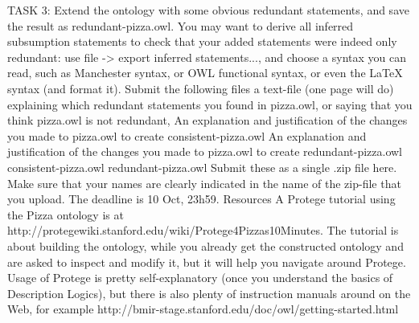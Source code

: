 TASK 3: Extend the ontology with some obvious redundant statements, and save the result as redundant-pizza.owl. You may want to derive all inferred subsumption statements to check that your added statements were indeed only redundant: use file -> export inferred statements..., and choose a syntax you can read, such as Manchester syntax, or OWL functional syntax, or even the LaTeX syntax (and format it).
Submit the following files
a text-file (one page will do) explaining
which redundant statements you found in pizza.owl, or saying that you think pizza.owl is not redundant,
An explanation and justification of the changes you made to pizza.owl to create consistent-pizza.owl
An explanation and justification of the changes you made to pizza.owl to create redundant-pizza.owl
consistent-pizza.owl
redundant-pizza.owl
Submit these as a single .zip file here. Make sure that your names are clearly indicated in the name of the zip-file that you upload. The deadline is 10 Oct, 23h59.
Resources
A Protege tutorial using the Pizza ontology is at http://protegewiki.stanford.edu/wiki/Protege4Pizzas10Minutes. The tutorial is about building the ontology, while you already get the constructed ontology and are asked to inspect and modify it, but it will help you navigate around Protege.
Usage of Protege is pretty self-explanatory (once you understand the basics of Description Logics), but there is also plenty of instruction manuals around on the Web, for example http://bmir-stage.stanford.edu/doc/owl/getting-started.html
